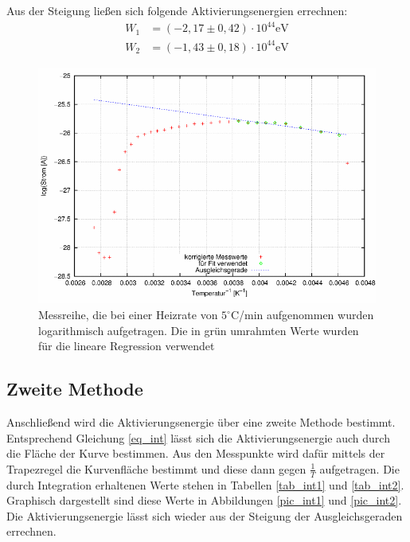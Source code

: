 Aus der Steigung ließen sich folgende Aktivierungsenergien errechnen:
\begin{align}
W_1&=(-2,17\pm 0,42)\cdot10^{44} \text{eV}\\
W_2&=(-1,43 \pm 0,18)\cdot10^{44} \text{eV}
\end{align}
\begin{figure}[H]
\includegraphics[scale=0.8]{../gnu/relax22.pdf}
\caption{Messreihe, die bei einer Heizrate von $5^\circ$C/min aufgenommen wurden logarithmisch aufgetragen. Die in grün umrahmten Werte wurden für die lineare Regression verwendet}
\label{pic_22}
\end{figure}

\subsection{Zweite Methode}
Anschließend wird die Aktivierungsenergie über eine zweite Methode bestimmt. Entsprechend Gleichung \eqref{eq_int} lässt sich die Aktivierungsenergie auch durch die Fläche der Kurve bestimmen. Aus den Messpunkte wird dafür mittels der Trapezregel die Kurvenfläche bestimmt und diese dann gegen $\frac{1}{T}$ aufgetragen. Die durch Integration erhaltenen Werte stehen in Tabellen \ref{tab_int1} und \ref{tab_int2}. Graphisch dargestellt sind diese Werte in Abbildungen \ref{pic_int1} und \ref{pic_int2}. Die Aktivierungsenergie lässt sich wieder aus der Steigung der Ausgleichsgeraden errechnen.

